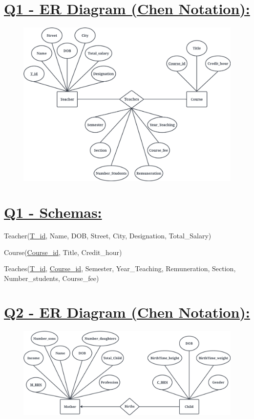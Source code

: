 \documentclass[a4paper, 12pt]{article}
\begin{document}
\section{\textbf{\uline{Q1 - ER Diagram (Chen Notation):}}}
\begin{figure}
    \centering
    \includegraphics[width=1\linewidth]{Q1.jpeg}
\end{figure}


\section{\textbf{\uline{Q1 - Schemas:}}}
Teacher(\uline{T{\_}id}, Name, DOB, Street, City, Designation, Total{\_}Salary)

Course(\uline{Course{\_}id}, Title, Credit{\_}hour)

Teaches(\uline{T{\_}id}, \uline{Course{\_}id}, Semester, Year\_Teaching, Remuneration, Section, Number\_students, Course\_fee)


\break
\section{\textbf{\uline{Q2 - ER Diagram (Chen Notation):}}}
\begin{figure}
    \centering
    \includegraphics[width=1\linewidth]{Q2.jpeg}
    
    
\end{figure}
\end{document}
